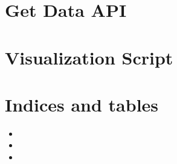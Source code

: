 \documentclass[letterpaper,10pt,english]{sphinxmanual}
\begin{document}
\chapter{Get Data API}
\label{\detokenize{index:get-data-api}}

\chapter{Visualization Script}
\label{\detokenize{index:visualization-script}}

\chapter{Indices and tables}
\label{\detokenize{index:indices-and-tables}}\begin{itemize}
\item {} 
\sphinxAtStartPar
{}

\item {} 
\sphinxAtStartPar
{}

\item {} 
\sphinxAtStartPar
{}

\end{itemize}



\renewcommand{\indexname}{Index}
\printindex
\end{document}

